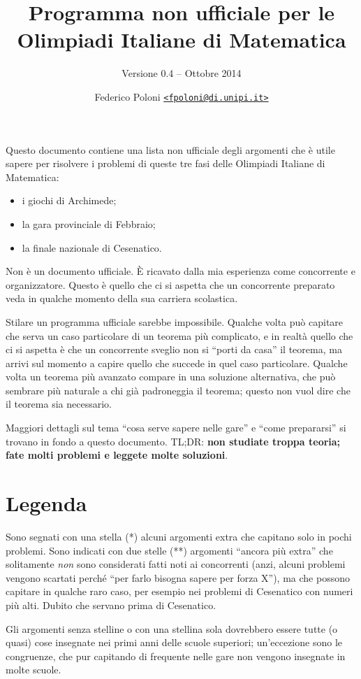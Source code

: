 \documentclass[a4paper,10pt]{paper}
\date{}
\title{Programma non ufficiale per le Olimpiadi Italiane di Matematica}
\subtitle{Versione 0.4 -- Ottobre 2014}
\author{Federico Poloni \href{mailto:fpoloni@di.unipi.it}{\texttt{<fpoloni@di.unipi.it>}}}
\renewcommand{\star}{(*)}
\newcommand{\sstar}{(**)}
\begin{document}
 \maketitle
 
 Questo documento contiene una lista non ufficiale degli argomenti che è utile sapere per risolvere i problemi di queste tre fasi delle Olimpiadi Italiane di Matematica:
 \begin{itemize}
  \item i giochi di Archimede;
  \item la gara provinciale di Febbraio;
  \item la finale nazionale di Cesenatico.
 \end{itemize}

 Non è un documento ufficiale. È ricavato dalla mia esperienza come concorrente e organizzatore. Questo è quello che ci si aspetta che un concorrente preparato veda in qualche momento della sua carriera scolastica.
 
 Stilare un programma ufficiale sarebbe impossibile. Qualche volta può capitare che serva un caso particolare di un teorema più complicato, e in realtà quello che ci si aspetta è che un concorrente sveglio non si ``porti da casa'' il teorema, ma arrivi sul momento a capire quello che succede in quel caso particolare. Qualche volta un teorema più avanzato compare in una soluzione alternativa, che può sembrare più naturale a chi già padroneggia il teorema; questo non vuol dire che il teorema sia necessario.

 Maggiori dettagli sul tema ``cosa serve sapere nelle gare'' e ``come prepararsi'' si trovano in fondo a questo documento. TL;DR: \textbf{non studiate troppa teoria; fate molti problemi e leggete molte soluzioni}.
 
\section*{Legenda}
Sono segnati con una stella \star{} alcuni argomenti extra che capitano solo in pochi problemi. Sono indicati con due stelle \sstar{} argomenti ``ancora più extra'' che solitamente \emph{non} sono considerati fatti noti ai concorrenti (anzi, alcuni problemi vengono scartati perché ``per farlo bisogna sapere per forza X''), ma che possono capitare in qualche raro caso, per esempio nei problemi di Cesenatico con numeri più alti. Dubito che servano prima di Cesenatico.

Gli argomenti senza stelline o con una stellina sola dovrebbero essere tutte (o quasi) cose insegnate nei primi anni delle scuole superiori; un'eccezione sono le congruenze, che pur capitando di frequente nelle gare non vengono insegnate in molte scuole.
\end{document}
